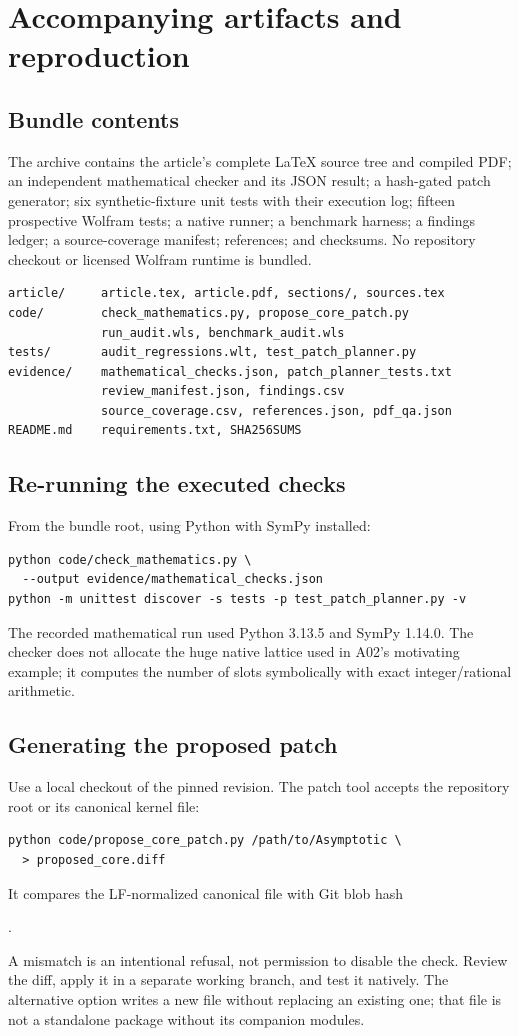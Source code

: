\section{Accompanying artifacts and reproduction}
\subsection{Bundle contents}
The archive contains the article's complete LaTeX source tree and compiled PDF; an independent mathematical checker and its JSON result; a hash-gated patch generator; six synthetic-fixture unit tests with their execution log; fifteen prospective Wolfram tests; a native runner; a benchmark harness; a findings ledger; a source-coverage manifest; references; and checksums. No repository checkout or licensed Wolfram runtime is bundled.

\begin{lstlisting}
article/     article.tex, article.pdf, sections/, sources.tex
code/        check_mathematics.py, propose_core_patch.py
             run_audit.wls, benchmark_audit.wls
tests/       audit_regressions.wlt, test_patch_planner.py
evidence/    mathematical_checks.json, patch_planner_tests.txt
             review_manifest.json, findings.csv
             source_coverage.csv, references.json, pdf_qa.json
README.md    requirements.txt, SHA256SUMS
\end{lstlisting}

\subsection{Re-running the executed checks}
From the bundle root, using Python with SymPy installed:
\begin{lstlisting}
python code/check_mathematics.py \
  --output evidence/mathematical_checks.json
python -m unittest discover -s tests -p test_patch_planner.py -v
\end{lstlisting}
The recorded mathematical run used Python 3.13.5 and SymPy 1.14.0. The checker does not allocate the huge native lattice used in A02's motivating example; it computes the number of slots symbolically with exact integer/rational arithmetic.

\subsection{Generating the proposed patch}
Use a local checkout of the pinned revision. The patch tool accepts the repository root or its canonical kernel file:
\begin{lstlisting}
python code/propose_core_patch.py /path/to/Asymptotic \
  > proposed_core.diff
\end{lstlisting}
It compares the LF-normalized canonical file with Git blob hash
\begin{center}.\end{center}
A mismatch is an intentional refusal, not permission to disable the check. Review the diff, apply it in a separate working branch, and test it natively. The alternative  option writes a new file without replacing an existing one; that file is not a standalone package without its companion modules.

